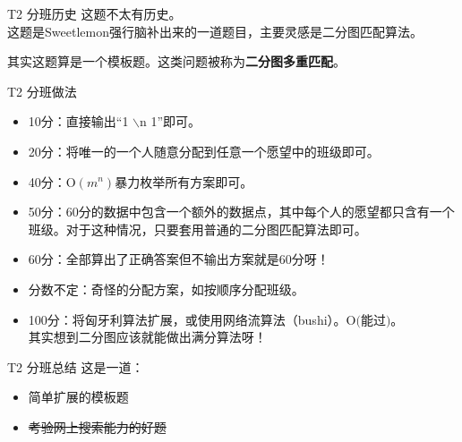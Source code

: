 \documentclass[utf8]{beamer}
\begin{document}
\begin{frame}{T2 分班}{历史}
    这题不太有历史。\\
    这题是Sweetlemon强行脑补出来的一道题目，主要灵感是二分图匹配算法。\newline

    \pause
    其实这题算是一个模板题。这类问题被称为\textbf{二分图多重匹配}。
\end{frame}
\begin{frame}{T2 分班}{做法}
    \begin{itemize}
        \item 10分：直接输出“1 $\backslash \text{n}$ 1”即可。
        \pause
        \item 20分：将唯一的一个人随意分配到任意一个愿望中的班级即可。
        \pause
        \item 40分：$\text{O}(m^n)$暴力枚举所有方案即可。
        \pause
        \item 50分：60分的数据中包含一个额外的数据点，其中每个人的愿望都只含有一个班级。对于这种情况，只要套用普通的二分图匹配算法即可。
        \pause
        \item 60分：全部算出了正确答案但不输出方案就是60分呀！
        \pause
        \item 分数不定：奇怪的分配方案，如按顺序分配班级。
        \pause
        \item 100分：将匈牙利算法扩展，或使用网络流算法（bushi）。$\text{O(能过)}$。\\其实想到二分图应该就能做出满分算法呀！
    \end{itemize}
\end{frame}
\begin{frame}{T2 分班}{总结}
    这是一道：
    \begin{itemize}
        \item 简单扩展的模板题
        \item \sout{考验网上搜索能力的好题}
    \end{itemize}
\end{frame}
\end{document}
